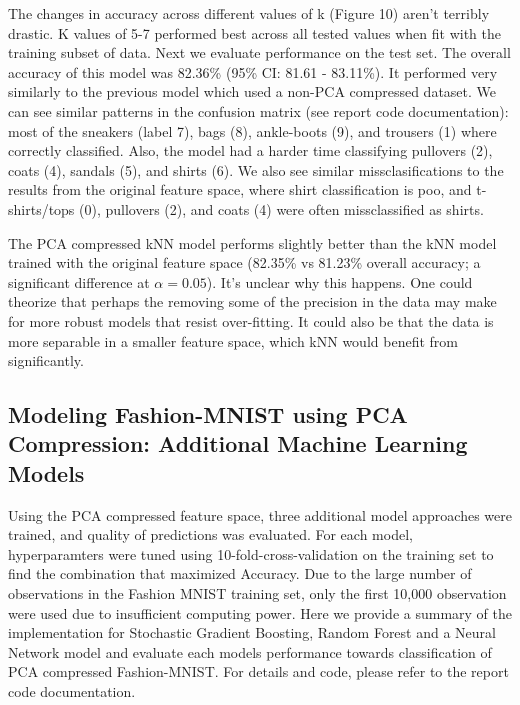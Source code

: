 \documentclass{article}
\begin{document}
The changes in accuracy across different values of k (Figure 10) aren't
terribly drastic. K values of 5-7 performed best across all tested
values when fit with the training subset of data. Next we evaluate
performance on the test set. The overall accuracy of this model was
82.36\% (95\% CI: 81.61 - 83.11\%). It performed very similarly to the
previous model which used a non-PCA compressed dataset. We can see
similar patterns in the confusion matrix (see report code
documentation): most of the sneakers (label 7), bags (8), ankle-boots
(9), and trousers (1) where correctly classified. Also, the model had a
harder time classifying pullovers (2), coats (4), sandals (5), and
shirts (6). We also see similar missclasifications to the results from
the original feature space, where shirt classification is poo, and
t-shirts/tops (0), pullovers (2), and coats (4) were often
missclassified as shirts.

The PCA compressed kNN model performs slightly better than the kNN model
trained with the original feature space (82.35\% vs 81.23\% overall
accuracy; a significant difference at \(\alpha = 0.05\)). It's unclear
why this happens. One could theorize that perhaps the removing some of
the precision in the data may make for more robust models that resist
over-fitting. It could also be that the data is more separable in a
smaller feature space, which kNN would benefit from significantly.

\hypertarget{modeling-fashion-mnist-using-pca-compression-additional-machine-learning-models}{%
\subsection{Modeling Fashion-MNIST using PCA Compression: Additional
Machine Learning
Models}\label{modeling-fashion-mnist-using-pca-compression-additional-machine-learning-models}}

Using the PCA compressed feature space, three additional model
approaches were trained, and quality of predictions was evaluated. For
each model, hyperparamters were tuned using 10-fold-cross-validation on
the training set to find the combination that maximized Accuracy. Due to
the large number of observations in the Fashion MNIST training set, only
the first 10,000 observation were used due to insufficient computing
power. Here we provide a summary of the implementation for Stochastic
Gradient Boosting, Random Forest and a Neural Network model and evaluate
each models performance towards classification of PCA compressed
Fashion-MNIST. For details and code, please refer to the report code
documentation.
\end{document}
